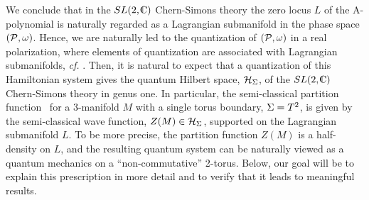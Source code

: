 We conclude that in the $SL(2,\IC)$ Chern-Simons theory
the zero locus $L$ of the A-polynomial is naturally regarded as
a Lagrangian submanifold in the phase space $({\cal P},\omega)$.
Hence, we are naturally led to the quantization of $({\cal P},\omega)$
in a real polarization,
where elements of quantization are
associated with Lagrangian submanifolds, {\it cf.} .
Then, it is natural to expect that
a quantization of this Hamiltonian system
gives the quantum Hilbert space, ${\cal H}_{{\Sigma}}$,
of the $SL(2,\IC)$ Chern-Simons theory in genus one.
In particular, the semi-classical partition function \zpathint\
for a 3-manifold $M$ with a single torus boundary, ${\Sigma} = T^2$,
is given by the semi-classical wave function, $Z(M) \in {\cal H}_{{\Sigma}}$,
supported on the Lagrangian submanifold $L$.
To be more precise, the partition function $Z(M)$
is a half-density on $L$,
and the resulting quantum system can be naturally viewed
as a quantum mechanics on a ``non-commutative'' 2-torus.
Below, our goal will be to explain this prescription in more detail
and to verify that it leads to meaningful results.

